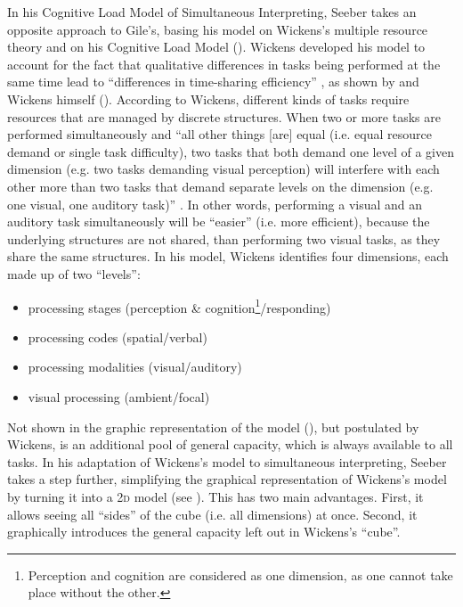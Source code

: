 \documentclass[output=paper]{langsci/langscibook}
\begin{document}
In his Cognitive Load Model of Simultaneous Interpreting, Seeber takes an opposite approach to Gile’s, basing his model on Wickens’s multiple resource theory and on his Cognitive Load Model (\citeyear{Wickens1984, Wickens2002}). Wickens developed his model to account for the fact that qualitative differences in tasks being performed at the same time lead to ``differences in time-sharing efficiency'' \citep[162]{Wickens2002}, as shown by \citeauthor{Kantowitz1976} and Wickens himself (\citeyear{Wickens1976}). According to Wickens, different kinds of tasks require resources that are managed by discrete structures. When two or more tasks are performed simultaneously and ``all other things [are] equal (i.e. equal resource demand or single task difficulty), two tasks that both demand one level of a given dimension (e.g. two tasks demanding visual perception) will interfere with each other more than two tasks that demand separate levels on the dimension (e.g. one visual, one auditory task)'' \citep{Wickens2002}. In other words, performing a visual and an auditory task simultaneously will be ``easier'' (i.e. more efficient), because the underlying structures are not shared, than performing two visual tasks, as they share the same structures. In his model, Wickens identifies four dimensions, each made up of two ``levels'':
\begin{itemize}
\item processing stages (perception \& cognition\footnote{Perception and cognition are considered as one dimension, as one cannot take place without the other.}\slash responding)
\item processing codes (spatial\slash verbal)
\item processing modalities (visual\slash auditory)
\item visual processing (ambient\slash focal)
\end{itemize}

Not shown in the graphic representation of the model (), but postulated by Wickens, is an additional pool of general capacity, which is always available to all tasks. In his adaptation of Wickens’s model to simultaneous interpreting, Seeber takes a step further, simplifying the graphical representation of Wickens’s model by turning it into a \textsc{2d} model (see ). This has two main advantages. First, it allows seeing all ``sides'' of the cube (i.e. all dimensions) at once. Second, it graphically introduces the general capacity left out in Wickens’s ``cube''. 
\end{document}
